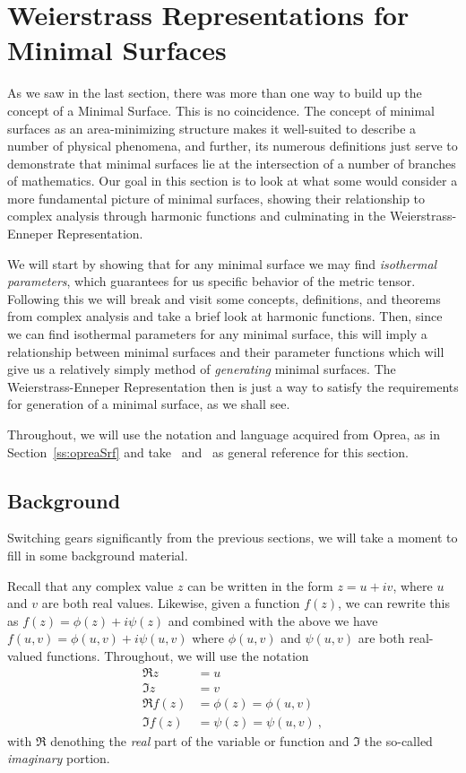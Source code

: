 \section{Weierstrass Representations for Minimal Surfaces}

  As we saw in the last section, there was more than one way to build up the concept of a Minimal Surface. This is no coincidence. The concept of minimal surfaces as an area-minimizing structure makes it well-suited to describe a number of physical phenomena, and further, its numerous definitions just serve to demonstrate that minimal surfaces lie at the intersection of a number of branches of mathematics. Our goal in this section is to look at what some would consider a more fundamental picture of minimal surfaces, showing their relationship to complex analysis through harmonic functions and culminating in the Weierstrass-Enneper Representation.

  We will start by showing that for any minimal surface we may find \emph{isothermal parameters}, which guarantees for us specific behavior of the metric tensor. Following this we will break and visit some concepts, definitions, and theorems from complex analysis and take a brief look at harmonic functions. Then, since we can find isothermal parameters for any minimal surface, this will imply a relationship between minimal surfaces and their parameter functions which will give us a relatively simply method of \emph{generating} minimal surfaces. The Weierstrass-Enneper Representation then is just a way to satisfy the requirements for generation of a minimal surface, as we shall see.

  Throughout, we will use the notation and language acquired from Oprea, as in Section~\ref{ss:opreaSrf} and take~\cite{Opr07} and~\cite{Opr00} as general reference for this section.

\subsection{Background}
  Switching gears significantly from the previous sections, we will take a moment to fill in some background material.

  Recall that any complex value $z$ can be written in the form $z = u + iv$, where $u$ and $v$ are both real values. Likewise, given a function $f(z)$, we can rewrite this as $f(z) = \phi(z) + i\psi(z)$ and combined with the above we have $f(u, v) = \phi(u, v) + i \psi(u, v)$ where $\phi(u, v)$ and $\psi(u, v)$ are both real-valued functions. Throughout, we will use the notation
  \begin{align*}
    \Re z &= u\\
    \Im z &= v\\
    \Re f(z) &= \phi(z) = \phi(u, v)\\
    \Im f(z) &= \psi(z) = \psi(u, v) \ , 
  \end{align*}
  with $\Re$ denothing the \emph{real} part of the variable or function and $\Im$ the so-called \emph{imaginary} portion.

